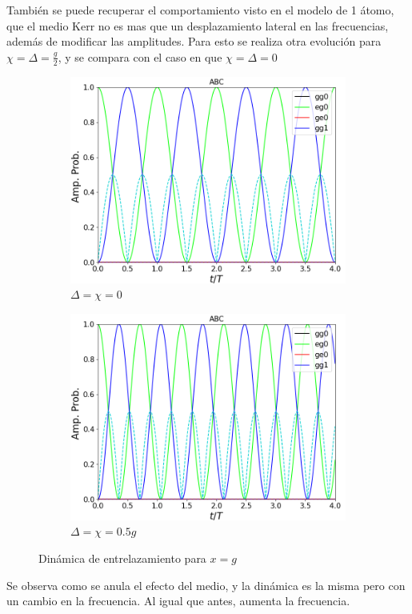 También se puede recuperar el comportamiento visto en el modelo de 1 átomo, que el medio Kerr no es mas que un desplazamiento lateral en las frecuencias, además de modificar las amplitudes. Para esto se realiza otra evolución para $\chi=\Delta=\frac{g}{2}$, y se compara con el caso en que $\chi=\Delta=0$
\begin{figure}[h]
    \centering
    \begin{subfigure}{0.49\textwidth}
        \includegraphics[width=\textwidth]{figuras/ch4/d=x=0 eg0 abc.png}
        \caption{$\Delta=\chi=0$}
        \label{fig4:comparacion kerr pob 1}
    \end{subfigure}
    \hfill
    \begin{subfigure}{0.49\textwidth}
        \includegraphics[width=\textwidth]{figuras/ch4/d=x=0.5 eg0 abc.png}
        \caption{$\Delta=\chi=0.5g$}
        \label{fig4:comparacion ker pob 2}
    \end{subfigure}
    \caption{Dinámica de entrelazamiento para $x=g$}
    \label{fig4:comparacion d vs x}
\end{figure}
Se observa como se anula el efecto del medio, y la dinámica es la misma pero con un cambio en la frecuencia. Al igual que antes, aumenta la frecuencia.

